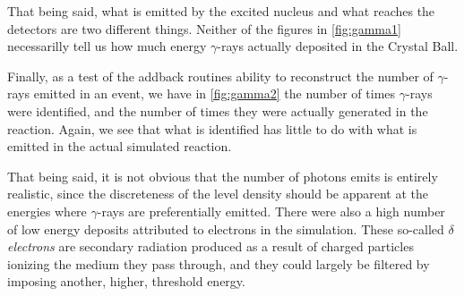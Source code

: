 That being said, what is emitted by the excited nucleus and what reaches the detectors are two different things. Neither of the figures in \autoref{fig:gamma1} necessarilly tell us how much energy $\gamma$-rays actually deposited in the Crystal Ball. 

Finally, as a test of the addback routines ability to reconstruct the number of $\gamma$-rays emitted in an event, we have in \autoref{fig:gamma2} the number of times $\gamma$-rays were identified, and the number of times they were actually generated in the reaction. Again, we see that what is identified has little to do with what is emitted in the actual simulated reaction.

That being said, it is not obvious that the number of photons \codename{} emits is entirely realistic, since the discreteness of the level density should be apparent at the energies where $\gamma$-rays are preferentially emitted. There were also a high number of low energy deposits attributed to electrons in the simulation. These so-called \emph{$\delta$ electrons} are secondary radiation produced as a result of charged particles ionizing the medium they pass through, and they could largely be filtered by imposing another, higher, threshold energy. 

